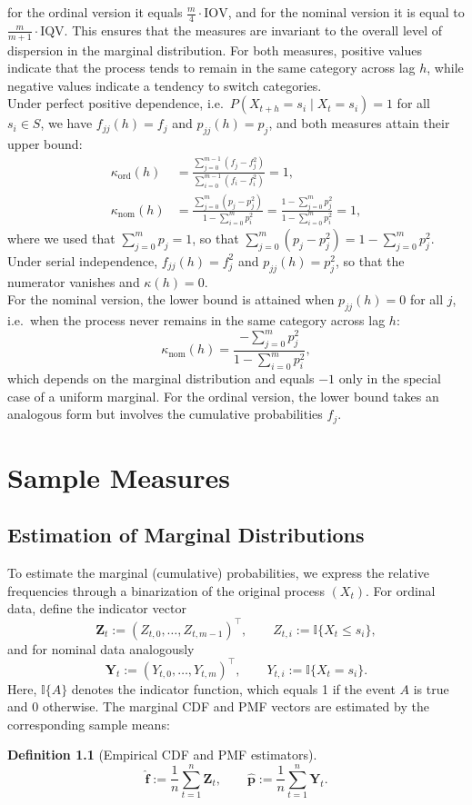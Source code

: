 ﻿\documentclass[12pt,a4paper]{scrreprt}
\theoremstyle{definition}
\newtheorem{definition}[theorem]{Definition}
\begin{document}
for the ordinal version it equals $\frac{m}{4}\cdot\mathrm{IOV}$, and for the
nominal version it is equal to $\frac{m}{m+1}\cdot \mathrm{IQV}$. This ensures that the measures are invariant to
the overall level of dispersion in the marginal distribution. For both measures, positive values indicate that the process tends to remain in the same
category across lag $h$, while negative values indicate a tendency to switch
categories.\\
Under perfect positive dependence, i.e.\ $P(X_{t+h} = s_i \mid X_t = s_i) = 1$
for all $s_i \in S$, we have $f_{jj}(h) = f_j$ and $p_{jj}(h) = p_j$, and both
measures attain their upper bound:
\begin{align*}
    \kappa_{\mathrm{ord}}(h) 
    &= \frac{\sum_{j=0}^{m-1}(f_j - f_j^2)}{\sum_{i=0}^{m-1}(f_i - f_i^2)} = 1, \\[1ex]
    \kappa_{\mathrm{nom}}(h) 
    &= \frac{\sum_{j=0}^{m}(p_j - p_j^2)}{1 - \sum_{i=0}^{m}p_i^2}
    = \frac{1 - \sum_{j=0}^{m}p_j^2}{1 - \sum_{i=0}^{m}p_i^2} = 1,
\end{align*}
where we used that $\sum_{j=0}^{m} p_j = 1$, so that $\sum_{j=0}^{m}(p_j - p_j^2) = 1 - \sum_{j=0}^{m} p_j^2$. 
Under serial independence, $f_{jj}(h) = f_j^2$ and $p_{jj}(h) = p_j^2$, so that
the numerator vanishes and $\kappa(h) = 0$.\\
For the nominal version, the lower bound is attained when $p_{jj}(h) = 0$ for all
$j$, i.e.\ when the process never remains in the same category across lag $h$:
\[
\kappa_{\mathrm{nom}}(h) 
= \frac{-\sum_{j=0}^{m}p_j^2}{1 - \sum_{i=0}^{m}p_i^2},
\]
which depends on the marginal distribution and equals $-1$ only in the special case
of a uniform marginal. For the ordinal version, the lower bound takes an analogous
form but involves the cumulative probabilities $f_j$.
\chapter{Sample Measures}\label{chap:sample}
\section{Estimation of Marginal Distributions}\label{sec:marg_dist}
To estimate the marginal (cumulative) probabilities, we express the
relative frequencies through a binarization of the original process
$(X_t)$. For ordinal data, define the indicator vector
\[
\boldsymbol{Z}_t := (Z_{t,0}, \ldots, Z_{t,m-1})^\top,
\qquad
Z_{t,i} := \mathbb{I}\{X_t \le s_i\},
\]
and for nominal data analogously
\[
\boldsymbol{Y}_t := (Y_{t,0}, \ldots, Y_{t,m})^\top,
\qquad
Y_{t,i} := \mathbb{I}\{X_t = s_i\}.
\]
Here, $\mathbb{I}\{A\}$ denotes the indicator function, which equals 1 if the event $A$ is true and 0 otherwise.
The marginal CDF and PMF vectors are estimated by the corresponding sample means:
\begin{definition}[Empirical CDF and PMF estimators]
\label{def:empirical_estimators}
\[
\hat{\boldsymbol{f}} := \frac{1}{n} \sum_{t=1}^n \boldsymbol{Z}_t,
\qquad
\hat{\boldsymbol{p}} := \frac{1}{n} \sum_{t=1}^n \boldsymbol{Y}_t.
\]
\end{definition}
\end{document}
